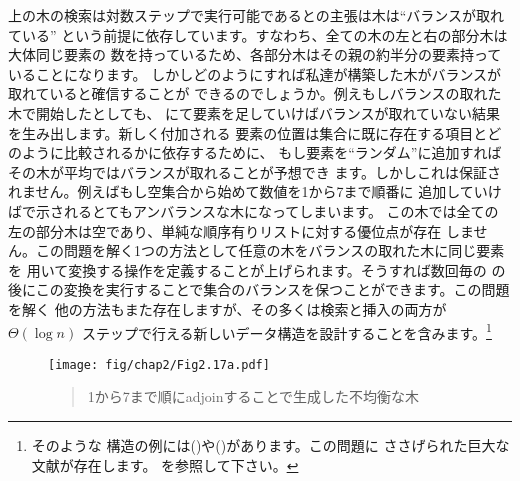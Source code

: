 \noindent
上の木の検索は対数ステップで実行可能であるとの主張は木は``バランスが取れている''
という前提に依存しています。すなわち、全ての木の左と右の部分木は大体同じ要素の
数を持っているため、各部分木はその親の約半分の要素持っていることになります。
しかしどのようにすれば私達が構築した木がバランスが取れていると確信することが
できるのでしょうか。例えもしバランスの取れた木で開始したとしても、
にて要素を足していけばバランスが取れていない結果を生み出します。新しく付加される
要素の位置は集合に既に存在する項目とどのように比較されるかに依存するために、
もし要素を``ランダム''に追加すればその木が平均ではバランスが取れることが予想でき
ます。しかしこれは保証されません。例えばもし空集合から始めて数値を1から7まで順番に
追加していけばで示されるとてもアンバランスな木になってしまいます。
この木では全ての左の部分木は空であり、単純な順序有りリストに対する優位点が存在
しません。この問題を解く1つの方法として任意の木をバランスの取れた木に同じ要素を
用いて変換する操作を定義することが上げられます。そうすれば数回毎の
の後にこの変換を実行することで集合のバランスを保つことができます。この問題を解く
他の方法もまた存在しますが、その多くは検索と挿入の両方が\( \Theta(\log n) \)
ステップで行える新しいデータ構造を設計することを含みます。\footnote{そのような
構造の例には()や()があります。この問題に
ささげられた巨大な文献が存在します。 を参照して下さい。}

\begin{figure}[tb]
\label{Figure 2.17}
\centering
\begin{comment}
\heading{Figure 2.17:} Unbalanced tree produced by adjoining 1 through 7 in sequence.

\begin{example}
1
 \
  2
   \
    4
     \
      5
       \
        6
         \
          7
\end{example}
\end{comment}
\texttt{[image: fig/chap2/Fig2.17a.pdf]}
\begin{quote}
 1から7まで順にadjoinすることで生成した不均衡な木
\end{quote}
\end{figure}

